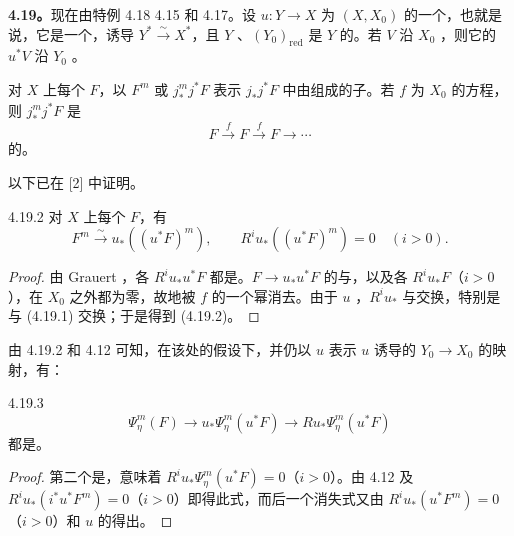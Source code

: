 \textbf{4.19。}现在由特例 4.18  4.15 和 4.17。设 $u:Y\to X$ 为 $(X,X_0)$ 的一个，也就是说，它是一个，诱导 $Y^*\xrightarrow{\sim}X^*$，且 $Y$ 、$(Y_0)_{\mathrm{red}}$ 是 $Y$ 的。若 $V$ 沿 $X_0$ ，则它的 $u^*V$ 沿 $Y_0$ 。

对 $X$ 上每个 $F$，以 $F^m$ 或 $j_*^mj^*F$ 表示 $j_*j^*F$ 中由组成的子。若 $f$ 为 $X_0$ 的方程，则 $j_*^mj^*F$ 是
\[
 F\xrightarrow{f}F\xrightarrow{f}F\longrightarrow\cdots\tag{4.19.1}
\]
的。

以下已在 [2] 中证明。
\begin{SGAresult}{}{4.19.2}
对 $X$ 上每个 $F$，有
\[
 F^m\xrightarrow{\sim}u_*((u^*F)^m),\qquad
 R^iu_*((u^*F)^m)=0\quad(i>0).
\]
\end{SGAresult}
\begin{proof}
由 Grauert ，各 $R^iu_*u^*F$ 都是。$F\to u_*u^*F$ 的与，以及各 $R^iu_*F$（$i>0$），在 $X_0$ 之外都为零，故地被 $f$ 的一个幂消去。由于 $u$ ，$R^iu_*$ 与交换，特别是与 (4.19.1) 交换；于是得到 (4.19.2)。
\end{proof}

由 4.19.2 和 4.12 可知，在该处的假设下，并仍以 $u$ 表示 $u$ 诱导的 $Y_0\to X_0$ 的映射，有：
\begin{SGAresult}{}{4.19.3}
\[
 \Psi_\eta^m(F)\longrightarrow u_*\Psi_\eta^m(u^*F)
 \longrightarrow Ru_*\Psi_\eta^m(u^*F)
\]
都是。
\end{SGAresult}
\begin{proof}
第二个是，意味着 $R^iu_*\Psi_\eta^m(u^*F)=0$（$i>0$）。由 4.12 及 $R^iu_*(i^*u^*F^m)=0$（$i>0$）即得此式，而后一个消失式又由 $R^iu_*(u^*F^m)=0$（$i>0$）和 $u$ 的得出。
\end{proof}

